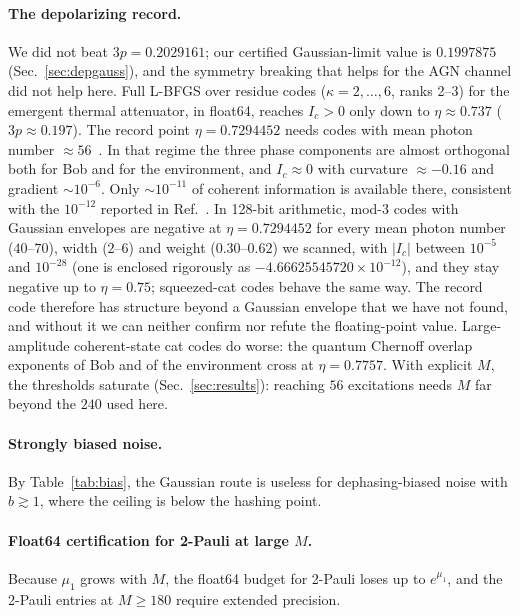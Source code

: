 \documentclass[aps,pra,reprint,superscriptaddress,nofootinbib,longbibliography,floatfix]{revtex4-2}
\theoremstyle{remark}
\newcommand{\Ic}{I_c}
\begin{document}
\paragraph*{The depolarizing record.} We did not beat $3p=0.2029161$; our certified Gaussian-limit value
is $0.1997875$ (Sec.~\ref{sec:depgauss}), and the symmetry breaking that
helps for the AGN channel did not help here. Full L-BFGS over residue codes
($\kappa=2,\dots,6$, ranks 2--3) for the emergent thermal attenuator, in float64, reaches $\Ic>0$ only
down to $\eta\approx0.737$ ($3p\approx0.197$). The record point $\eta=0.7294452$ needs codes with mean
photon number $\approx56$~\cite{ahmed2026choir}. In that regime the three phase components are almost
orthogonal both for Bob and for the environment, and $\Ic\approx0$ with curvature $\approx-0.16$ and
gradient $\sim10^{-6}$. Only $\sim10^{-11}$ of coherent information is available there, consistent with
the $10^{-12}$ reported in Ref.~\cite{ahmed2026choir}. In 128-bit arithmetic, mod-3 codes with Gaussian
envelopes are negative at $\eta=0.7294452$ for every mean photon number ($40$--$70$), width ($2$--$6$)
and weight ($0.30$--$0.62$) we scanned, with $|\Ic|$ between $10^{-5}$ and $10^{-28}$ (one is enclosed
rigorously as $-4.66625545720\times10^{-12}$), and they stay negative up to $\eta=0.75$; squeezed-cat
codes behave the same way. The record code therefore has structure beyond a Gaussian envelope that we
have not found, and without it we can neither confirm nor refute the floating-point value. Large-amplitude coherent-state cat codes do worse:
the quantum Chernoff overlap exponents of Bob and of the environment cross at $\eta=0.7757$. With
explicit $M$, the thresholds saturate (Sec.~\ref{sec:results}): reaching $56$ excitations needs $M$ far
beyond the $240$ used here.

\paragraph*{Strongly biased noise.} By Table~\ref{tab:bias}, the Gaussian route is useless for
dephasing-biased noise with $b\gtrsim1$, where the ceiling is below the hashing point.

\paragraph*{Float64 certification for 2-Pauli at large $M$.} Because $\mu_1$ grows with $M$, the float64
budget for 2-Pauli loses up to $e^{\mu_1}$, and the 2-Pauli entries at $M\ge180$ require extended
precision.
\end{document}
